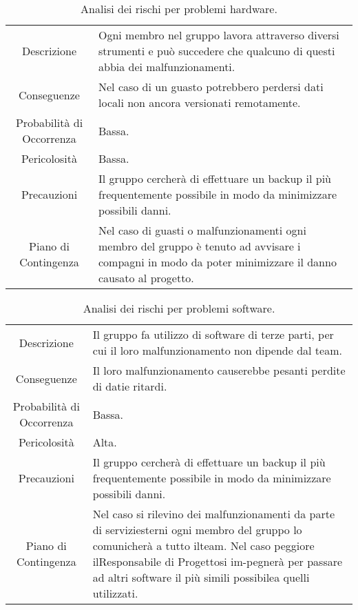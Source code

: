 \begin{table} [H]
    \begin{tabular}{|c | p{10cm}|}
        \rowcolor{darkblue}
    \hline
    \multicolumn{2}{|c|}{\textbf{RT2 - Problemi Hardware}} \\
    \hline
     Descrizione & Ogni membro nel gruppo lavora attraverso diversi strumenti e può succedere che qualcuno di questi abbia dei malfunzionamenti.\\ 
     \hline
     Conseguenze & Nel caso di un guasto potrebbero perdersi dati locali non ancora versionati remotamente.\\
     \hline
     Probabilità di Occorrenza & Bassa.\\
     \hline
     Pericolosità & Bassa.\\
     \hline
     Precauzioni & Il gruppo cercherà di effettuare un backup il più frequentemente possibile in modo da minimizzare possibili danni.\\  
     \hline
     Piano di Contingenza & Nel caso di guasti o malfunzionamenti ogni membro del gruppo è tenuto ad avvisare i compagni in modo da poter minimizzare il danno causato al progetto.\\ 
     \hline
    \end{tabular}
    \caption{\label{tab:RT2}Analisi dei rischi per problemi hardware.}
    \end{table}


\begin{table} [H]
    \begin{tabular}{|c | p{10cm}|}
        \rowcolor{darkblue}
    \hline
    \multicolumn{2}{|c|}{\textbf{RT3 - Problemi Software}} \\
    \hline
    Descrizione & Il gruppo fa utilizzo di software di terze parti, per cui il loro malfunzionamento non dipende dal team.\\ 
    \hline
    Conseguenze & Il loro malfunzionamento causerebbe pesanti perdite di datie ritardi.\\
    \hline
    Probabilità di Occorrenza & Bassa.\\
    \hline
    Pericolosità & Alta.\\
    \hline
    Precauzioni & Il gruppo cercherà di effettuare un backup il più frequentemente possibile in modo da minimizzare possibili danni.\\ 
    \hline
    Piano di Contingenza & Nel caso si rilevino dei malfunzionamenti da parte di serviziesterni ogni membro del gruppo lo comunicherà a tutto ilteam. Nel caso peggiore ilResponsabile di Progettosi im-pegnerà per passare ad altri software il più simili possibilea quelli utilizzati.\\ 
    \hline
    \end{tabular}
    \caption{\label{tab:RT3}Analisi dei rischi per problemi software.}
    
\end{table}



